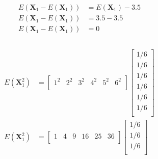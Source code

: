 \documentclass[12pt,letterpaper, onecolumn]{exam}
\begin{document}
\begin{questions}
\begin{parts}
{\begin{subparts}
\begin{equation}
\begin{split}
                                    E(\mathbf{X}_1 - E(\mathbf{X}_1)) & = E(\mathbf{X}_1) - 3.5\\
                                    E(\mathbf{X}_1 - E(\mathbf{X}_1)) & = 3.5 - 3.5\\
                                    E(\mathbf{X}_1 - E(\mathbf{X}_1)) & = 0\\
                                \end{split}
                            \end{equation}
\clearpage                            
                    \\
                        \solution
                            \begin{equation}
                                \begin{split}
                                    E(\mathbf{X}_1^2) & = 
                                    \begin{bmatrix}
                                        1^2 & 2^2 & 3^2 & 4^2 & 5^2 & 6^2\\
                                    \end{bmatrix}
                                    \begin{bmatrix}
                                        1/6\\
                                        1/6\\
                                        1/6\\
                                        1/6\\
                                        1/6\\
                                        1/6\\
                                    \end{bmatrix}\\
                                    E(\mathbf{X}_1^2) & = 
                                    \begin{bmatrix}
                                        1 & 4 & 9 & 16 & 25 & 36\\
                                    \end{bmatrix}
                                    \begin{bmatrix}
                                        1/6\\
                                        1/6\\
                                        1/6\\

\end{bmatrix}
\end{split}
\end{equation}
\end{subparts}}
\end{parts}
\end{questions}
\end{document}
